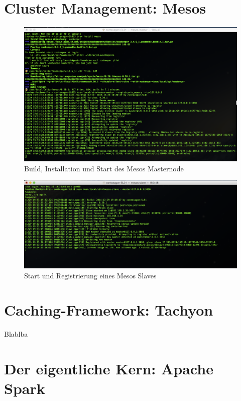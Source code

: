   

\section{Cluster Management: Mesos }
\label{section:mesos}

\begin{figure}[htb!]
\centering
\includegraphics[width=1.0\textwidth]{bilder/mesos.png}
\caption{Build, Installation und Start des Mesos Masternode }
\label{fig:mesos master]}
\end{figure} 



\begin{figure}[htb!]
\centering
\includegraphics[width=1.0\textwidth]{bilder/mesos_start.png}
\caption{Start und Registrierung eines Mesos Slaves}
\label{fig:mesos slave]}
\end{figure} 

\section{Caching-Framework: Tachyon}
\label{section:tachyon}

Blablba

\section{Der eigentliche Kern: Apache Spark}
\label{section:kern}

